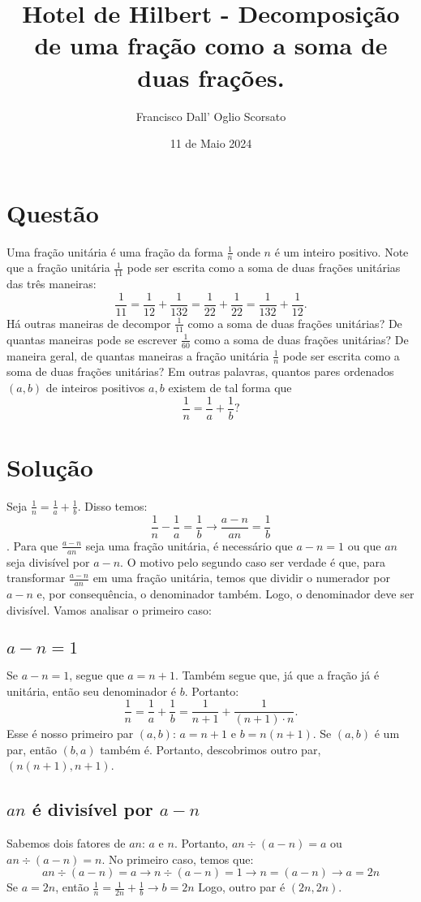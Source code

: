 \documentclass{article}
\title{Hotel de Hilbert - Decomposição de uma fração como a soma de duas frações.}
\author{Francisco Dall' Oglio Scorsato}
\date{11 de Maio 2024}
\begin{document}
\maketitle

\section{Questão}

Uma fração unitária é uma fração da forma \(\frac{1}{n}\) onde \(n\) é um inteiro positivo. Note que a fração unitária \(\frac{1}{11}\) pode ser escrita como a soma de duas frações unitárias das três maneiras:
    \[\frac{1}{11}=\frac{1}{12}+\frac{1}{132}=\frac{1}{22}+\frac{1}{22}=\frac{1}{132}+\frac{1}{12}.\]
Há outras maneiras de decompor \(\frac{1}{11}\) como a soma de duas frações unitárias? De quantas maneiras pode se escrever \(\frac{1}{60}\) como a soma de duas frações unitárias? De maneira geral, de quantas maneiras a fração unitária \(\frac{1}{n}\) pode ser escrita como a soma de duas frações unitárias? Em outras palavras, quantos pares ordenados \((a,b)\) de inteiros positivos \(a, b\) existem de tal forma que
    \[\frac{1}{n}=\frac{1}{a}+\frac{1}{b}?\]

\section{Solução}
Seja \(\frac{1}{n}=\frac{1}{a}+\frac{1}{b}\). Disso temos:
\[\frac{1}{n}-\frac{1}{a}=\frac{1}{b}\rightarrow \frac{a-n}{an}=\frac{1}{b}\].
Para que \(\frac{a-n}{an}\) seja uma fração unitária, é necessário que \(a-n = 1\) ou que \(an\) seja divisível por \(a-n\). O motivo pelo segundo caso ser verdade é que, para transformar \(\frac{a-n}{an}\) em uma fração unitária, temos que dividir o numerador por \(a-n\) e, por consequência, o denominador também. Logo, o denominador deve ser divisível.
Vamos analisar o primeiro caso:

\subsection{\(a-n = 1\)}
Se \(a-n = 1\), segue que \(a=n+1\). Também segue que, já que a fração já é unitária, então seu denominador é \(b\). Portanto:
\[\frac{1}{n}=\frac{1}{a}+\frac{1}{b}=\frac{1}{n+1}+\frac{1}{(n+1)\cdot n}.\]
Esse é nosso primeiro par \((a,b)\): \(a = n+1\) e \(b = n(n+1)\). Se \((a,b)\) é um par, então \((b,a)\) também é. Portanto, descobrimos outro par, \((n(n+1),n+1)\). 

\subsection{\(an\) é divisível por \(a-n\)}
Sabemos dois fatores de \(an\): \(a\) e \(n\). Portanto, \(an\div (a-n)=a\) ou \(an\div (a-n)=n\).
No primeiro caso, temos que:
\[an\div (a-n)=a\rightarrow n\div (a-n) = 1\rightarrow n = (a-n)\rightarrow a=2n\]
Se \(a=2n\), então \(\frac{1}{n}=\frac{1}{2n}+\frac{1}{b}\rightarrow b=2n\)
Logo, outro par é \((2n,2n)\).
\end{document}
